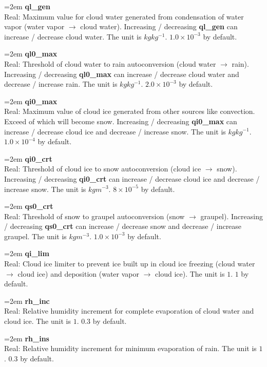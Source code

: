 \documentclass[letterpaper,titlepage,10pt]{article}
\numberwithin{equation}{section}
\begin{document}
\begin{appendices}
\hangindent=2em
\textbf{ql\_gen}\\ Real: Maximum value for cloud water generated from condensation of water vapor (water vapor $\rightarrow$ cloud water). Increasing / decreasing \textbf{ql\_gen} can increase / decrease cloud water. The unit is $kg kg^{-1}$. $1.0 \times 10^{-3}$ by default.

\hangindent=2em
\textbf{ql0\_max}\\ Real: Threshold of cloud water to rain autoconversion (cloud water $\rightarrow$ rain). Increasing / decreasing \textbf{ql0\_max} can increase / decrease cloud water and decrease / increase rain. The unit is $kg kg^{-1}$. $2.0 \times 10^{-3}$ by default.

\hangindent=2em
\textbf{qi0\_max}\\ Real: Maximum value of cloud ice generated from other sources like convection. Exceed of which will become snow. Increasing / decreasing \textbf{qi0\_max} can increase / decrease cloud ice and decrease / increase snow. The unit is $kg kg^{-1}$. $1.0 \times 10^{-4}$ by default.

\hangindent=2em
\textbf{qi0\_crt}\\ Real: Threshold of cloud ice to snow autoconversion (cloud ice $\rightarrow$ snow). Increasing / decreasing \textbf{qi0\_crt} can increase / decrease cloud ice and decrease / increase snow. The unit is $kg m^{-3}$. $8 \times 10^{-5}$ by default.

\hangindent=2em
\textbf{qs0\_crt}\\ Real: Threshold of snow to graupel autoconversion (snow $\rightarrow$ graupel). Increasing / decreasing \textbf{qs0\_crt} can increase / decrease snow and decrease / increase graupel. The unit is $kg m^{-3}$. $1.0 \times 10^{-3}$ by default.

\hangindent=2em
\textbf{qi\_lim}\\ Real: Cloud ice limiter to prevent ice built up in cloud ice freezing (cloud water $\rightarrow$ cloud ice) and deposition (water vapor $\rightarrow$ cloud ice). The unit is $1$. $1$ by default.

\hangindent=2em
\textbf{rh\_inc}\\ Real: Relative humidity increment for complete evaporation of cloud water and cloud ice. The unit is $1$. $0.3$ by default.

\hangindent=2em
\textbf{rh\_ins}\\ Real: Relative humidity increment for minimum evaporation of rain. The unit is $1$. $0.3$ by default.


\end{appendices}
\end{document}
